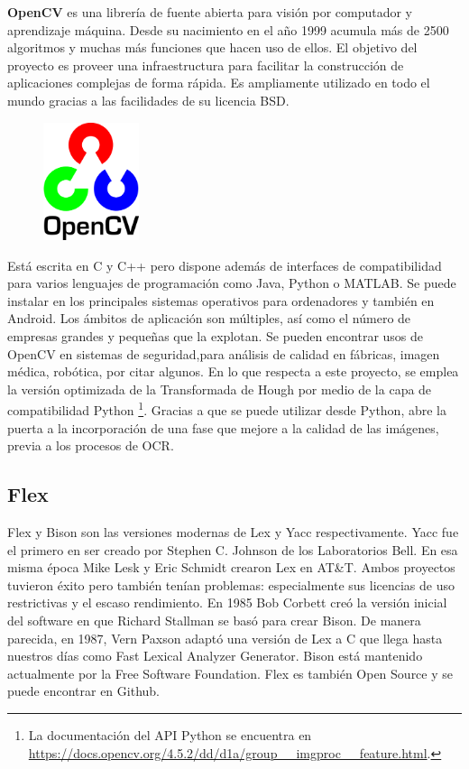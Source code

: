 \textbf{OpenCV} \cite{opencvTeam_oficialSite_main} es una librería de fuente abierta para visión por computador y aprendizaje máquina. Desde su nacimiento en el año 1999 acumula más de 2500 algoritmos y muchas más funciones que hacen uso de ellos. El objetivo del proyecto es proveer una infraestructura para facilitar la construcción de aplicaciones complejas de forma rápida. Es ampliamente utilizado en todo el mundo gracias a las facilidades de su licencia BSD. 

\begin{figure}
    \centering
    \includegraphics[width=0.25\textwidth]{imaxes/e-fundamentos-tecnologicos/logo-opencv.png}
\end{figure}

Está escrita en C y C++ pero dispone además de interfaces de compatibilidad para varios lenguajes de programación como Java, Python o MATLAB. Se puede instalar en los principales sistemas operativos para ordenadores y también en Android. Los ámbitos de aplicación son múltiples, así como el número de empresas grandes y pequeñas que la explotan. Se pueden encontrar usos de OpenCV en sistemas de seguridad,para análisis de calidad en fábricas, imagen médica, robótica, por citar algunos. En lo que respecta a este proyecto, se emplea la versión optimizada de la Transformada de Hough por medio de la capa de compatibilidad Python \footnote{La documentación del API Python se encuentra en \url{https://docs.opencv.org/4.5.2/dd/d1a/group__imgproc__feature.html}.}. Gracias a que se puede utilizar desde Python, abre la puerta a la incorporación de una fase que mejore a la calidad de las imágenes, previa a los procesos de OCR.

\subsection{Flex}
\label{subsec:flex}

Flex y Bison son las versiones modernas de Lex y Yacc respectivamente. Yacc fue el primero en ser creado por Stephen C. Johnson de los Laboratorios Bell. En esa misma época Mike Lesk y Eric Schmidt crearon Lex en AT\&T. Ambos proyectos tuvieron éxito pero también tenían problemas: especialmente sus licencias de uso restrictivas y el escaso rendimiento.
En 1985 Bob Corbett creó la versión inicial del software en que Richard Stallman se basó para crear Bison. De manera parecida, en 1987, Vern Paxson adaptó una versión de Lex a C que llega hasta nuestros días como Fast Lexical Analyzer Generator. Bison está mantenido actualmente por la Free Software Foundation. Flex es también Open Source y se puede encontrar en Github.

